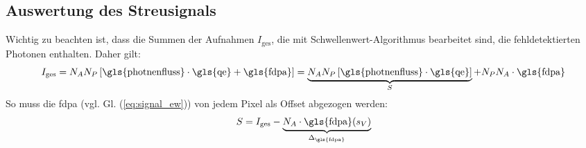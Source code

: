\subsection{Auswertung des Streusignals}
Wichtig zu beachten ist, dass die Summen der Aufnahmen $I_\text{ges}$, die mit Schwellenwert-Algorithmus bearbeitet sind, die fehldetektierten Photonen enthalten. Daher gilt:
\begin{equation}
    I_\text{ges} = N_A N_P \left[\text{\gls{photnenfluss}}\cdot \text{\gls{qe}} + \text{\gls{fdpa}}\right] = \underbrace{N_A N_P \left[\text{\gls{photnenfluss}}\cdot \text{\gls{qe}}\right]}_{S} + N_P N_A\cdot\text{\gls{fdpa}}
\end{equation}
So muss die \gls{fdpa} (vgl. Gl. (\ref{eq:signal_ew})) von jedem Pixel als Offset abgezogen werden:
\begin{equation}
    S = I_\text{ges} - \underbrace{N_A\cdot\text{\gls{fdpa}}(s_V)}_{\Delta_\text{\gls{fdpa}}}
    \label{eq:signal_int_fpda}
\end{equation}

